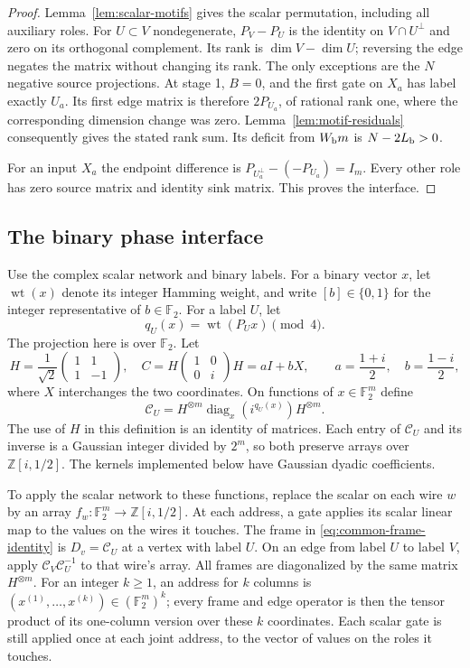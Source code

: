 \begin{proof}
Lemma~\ref{lem:scalar-motifs} gives the scalar permutation, including
all auxiliary roles.  For $U\subset V$ nondegenerate,
$P_V-P_U$ is the identity on $V\cap U^\perp$ and zero on its
orthogonal complement.  Its rank is $\dim V-\dim U$; reversing the
edge negates the matrix without changing its rank.
The only exceptions are the $N$ negative source projections.
At stage 1, $B=0$, and the first gate on $X_a$ has label exactly $U_a$.
Its first edge matrix is therefore $2P_{U_a}$, of rational rank one,
where the corresponding dimension change was zero.
Lemma~\ref{lem:motif-residuals} consequently gives the stated rank sum.
Its deficit from $W_{\rm b}m$ is $N-2L_{\rm b}>0$.

For an input $X_a$ the endpoint difference is
$P_{U_a^\perp}-(-P_{U_a})=I_m$.  Every other role has zero source
matrix and identity sink matrix.  This proves the interface.
\end{proof}

\subsection{The binary phase interface}

Use the complex scalar network and binary labels.  For a binary vector
$x$, let $\operatorname{wt}(x)$ denote its integer Hamming weight, and
write $[b]\in\{0,1\}$ for the integer representative of $b\in\mathbb F_2$.
For a label $U$, let
\[
 q_U(x)=\operatorname{wt}(P_Ux)\pmod4.
\]
The projection here is over $\mathbb F_2$.
Let
\[
 H=\frac1{\sqrt2}\begin{pmatrix}1&1\\1&-1\end{pmatrix},\quad
 C=H\begin{pmatrix}1&0\\0&i\end{pmatrix}H
   =aI+bX,\qquad a=\frac{1+i}{2},\quad b=\frac{1-i}{2},
\]
where $X$ interchanges the two coordinates.  On functions of
$x\in\mathbb F_2^m$ define
\[
 \mathcal C_U=H^{\otimes m}\operatorname{diag}_x(i^{q_U(x)})H^{\otimes m}.
\]
The use of $H$ in this definition is an identity of matrices.  Each entry
of $\mathcal C_U$ and its inverse is a Gaussian integer divided by $2^m$,
so both preserve arrays over $\mathbb Z[i,1/2]$.  The kernels implemented
below have Gaussian dyadic coefficients.

To apply the scalar network to these functions, replace the scalar on
each wire $w$ by an array
$f_w:\mathbb F_2^m\to\mathbb Z[i,1/2]$.  At each address, a gate
applies its scalar linear map to the values on the wires it touches.
The frame in \eqref{eq:common-frame-identity} is $D_v=\mathcal C_U$ at a
vertex with label $U$.  On an edge from label $U$ to label $V$, apply
$\mathcal C_V\mathcal C_U^{-1}$ to that wire's array.
All frames are diagonalized by the same matrix $H^{\otimes m}$.
For an integer $k\ge1$, an address for $k$ columns is
$(x^{(1)},\ldots,x^{(k)})\in(\mathbb F_2^m)^k$; every frame and edge
operator is then the tensor product of its one-column version over
these $k$ coordinates.  Each scalar gate is still applied once at each
joint address, to the vector of values on the roles it touches.

